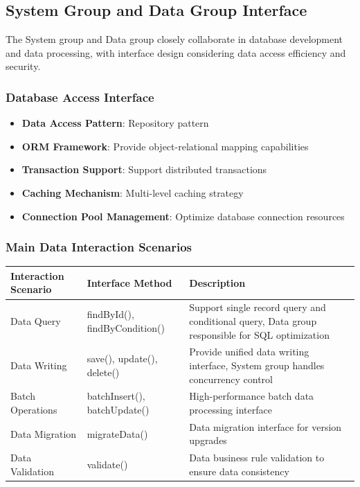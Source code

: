 \documentclass[a4paper,12pt]{article}
\begin{document}
\subsection{System Group and Data Group Interface}

The System group and Data group closely collaborate in database development and data processing, with interface design considering data access efficiency and security.

\subsubsection{Database Access Interface}

\begin{itemize}
  \item \textbf{Data Access Pattern}: Repository pattern
  \item \textbf{ORM Framework}: Provide object-relational mapping capabilities
  \item \textbf{Transaction Support}: Support distributed transactions
  \item \textbf{Caching Mechanism}: Multi-level caching strategy
  \item \textbf{Connection Pool Management}: Optimize database connection resources
\end{itemize}

\subsubsection{Main Data Interaction Scenarios}

\begin{longtable}{|p{3cm}|p{4cm}|p{8cm}|}
\hline
\textbf{Interaction Scenario} & \textbf{Interface Method} & \textbf{Description} \\
\hline
\endhead
Data Query & findById(), findByCondition() & Support single record query and conditional query, Data group responsible for SQL optimization \\
\hline
Data Writing & save(), update(), delete() & Provide unified data writing interface, System group handles concurrency control \\
\hline
Batch Operations & batchInsert(), batchUpdate() & High-performance batch data processing interface \\
\hline
Data Migration & migrateData() & Data migration interface for version upgrades \\
\hline
Data Validation & validate() & Data business rule validation to ensure data consistency \\
\hline
\end{longtable}
\end{document}

